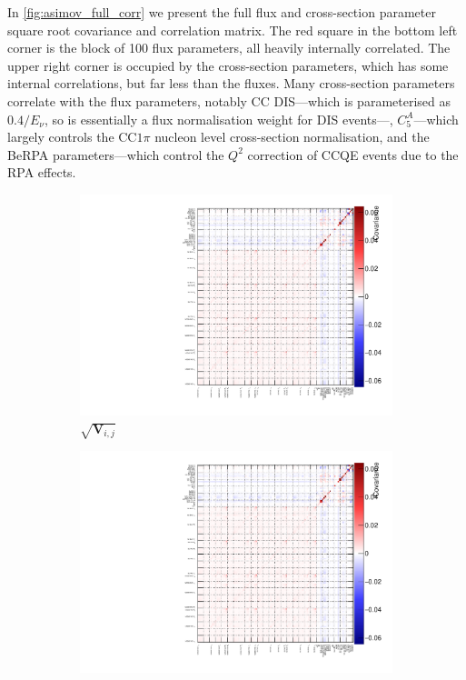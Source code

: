 In \autoref{fig:asimov_full_corr} we present the full flux and cross-section parameter square root covariance and correlation matrix. The red square in the bottom left corner is the block of 100 flux parameters, all heavily internally correlated. The upper right corner is occupied by the cross-section parameters, which has some internal correlations, but far less than the fluxes. Many cross-section parameters correlate with the flux parameters, notably CC DIS---which is parameterised as $0.4/E_\nu$, so is essentially a flux normalisation weight for DIS events---, $C_5^A$---which largely controls the CC$1\pi$ nucleon level cross-section normalisation, and the BeRPA parameters---which control the $Q^2$ correction of CCQE events due to the RPA effects.
\begin{figure}[h]
	\begin{subfigure}[t]{0.49\textwidth}
		\includegraphics[width=\textwidth, trim={0mm 0mm 0mm 0mm}, clip,page=2]{figures/mach3/Asimov/2017b_NewDet_NewData_Asimov_Long_0_drawCorr.pdf}
		\caption{$\sqrt{\mathbf{V}_{i,j}}$}
	\end{subfigure}
	\begin{subfigure}[t]{0.49\textwidth}
		\includegraphics[width=\textwidth, trim={0mm 0mm 0mm 0mm}, clip,page=3]{figures/mach3/Asimov/2017b_NewDet_NewData_Asimov_Long_0_drawCorr.pdf}

\end{subfigure}
\end{figure}
